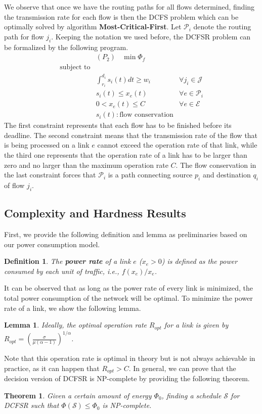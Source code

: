 \documentclass[10pt, conference, compsocconf]{IEEEtran}
\newtheorem{theorem}{Theorem}
\newtheorem{lemma}{Lemma}
\newtheorem{definition}{Definition}
\begin{document}
We observe that once we have the routing paths for all flows determined, finding the transmission rate for each flow is then the DCFS problem which can be optimally solved by algorithm \textbf{Most-Critical-First}. Let $\mathcal{P}_i$ denote the routing path for flow $j_i$. Keeping the notation we used before, the DCFSR problem can be formalized by the following program.
\begin{equation}
\begin{aligned}
&(P_2)~~~~\min \Phi_f \\
\text{subject to} \\
&\int_{r_i}^{d_i} s_i(t) dt \geq w_i  & \forall j_i \in \mathcal{J}\\
& s_i(t) \leq x_e(t) & \forall e \in \mathcal{P}_i \\
& 0 < x_e(t) \leq C  & \forall e \in \mathcal{E} \\
& s_i(t): \text{flow conservation}
\end{aligned}
\nonumber
\end{equation}
The first constraint represents that each flow has to be finished before its deadline. The second constraint means that the transmission rate of the flow that is being processed on a link $e$ cannot exceed the operation rate of that link, while the third one represents that the operation rate of a link has to be larger than zero and no larger than the maximum operation rate $C$. The flow conservation in the last constraint forces that $\mathcal{P}_i$ is a path connecting source $p_i$ and destination $q_i$ of flow $j_i$.


\subsection{Complexity and Hardness Results}

First, we provide the following definition and lemma as preliminaries based on our power consumption model. 
\begin{definition}
The \textbf{power rate} of a link $e$ ($x_e > 0$) is defined as the power consumed by each unit of traffic, i.e., $f(x_e)/x_e$.
\end{definition}
It can be observed that as long as the power rate of every link is minimized, the total power consumption of the network will be optimal. To minimize the power rate of a link, we show the following lemma.
\begin{lemma}
\label{lm:opt_rate}
Ideally, the optimal operation rate $R_{opt}$ for a link is given by $R_{opt} = \left( \frac{\sigma}{\mu(\alpha-1)} \right)^{1/\alpha}$.
\end{lemma}
Note that this operation rate is optimal in theory but is not always achievable in practice, as it can happen that $R_{opt}> C$. In general, we can prove that the decision version of DCFSR is NP-complete by providing the following theorem.
\begin{theorem}
Given a certain amount of energy $\Phi_0$, finding a schedule $\mathcal{S}$ for DCFSR such that $\Phi(\mathcal{S}) \leq \Phi_0$ is NP-complete.
\end{theorem}
\end{document}
